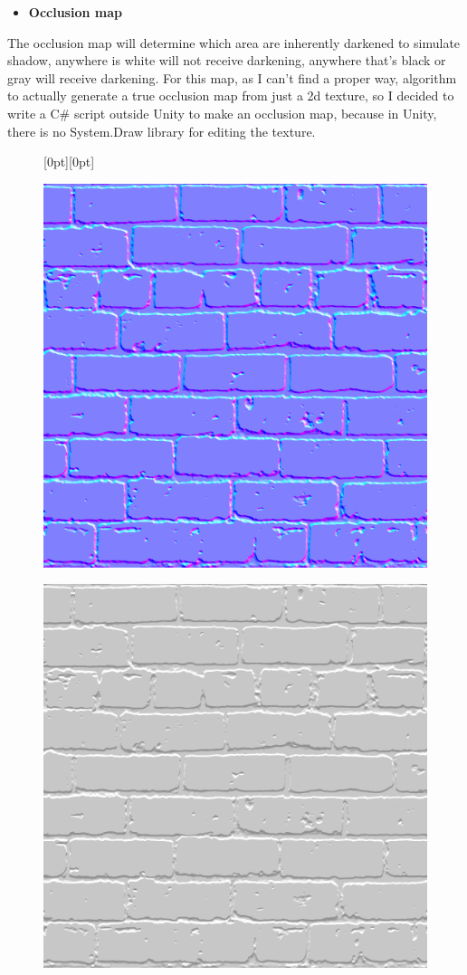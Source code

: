 \documentclass[a4paper, 13pt]{extarticle}
\begin{document}
{\begin{itemize}
	\item \bfseries Occlusion map	 	
\end{itemize}
The occlusion map will determine which area are inherently darkened to simulate shadow, anywhere is white will not receive darkening, anywhere that's black or gray will receive darkening. For this map, as I can't find a proper way, algorithm to actually generate a true occlusion map from just a 2d texture, so I decided to write a C\# script outside Unity to make an occlusion map, because in Unity, there is no System.Draw library for editing the texture.
\newpage
\begin{figure}[h]
	\centering
	\raisebox{-25mm}[0pt][0pt]{
		\begin{minipage}{.4\textwidth}
			\centering
			\includegraphics[width=0.8\linewidth]{intructions/Brick001_n.png}
			\centering
			\label{fig:test22}
		\end{minipage}
		\begin{minipage}{.4\textwidth}
			\centering
			\includegraphics[width=0.8\linewidth]{intructions/Brick001_occ.png}

\end{minipage}}
\end{figure}}
\end{document}
